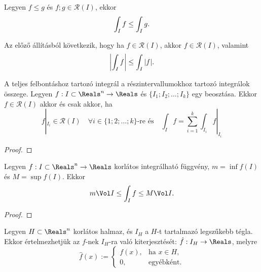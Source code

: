 \begin{statement}
  Legyen $f \leq g$ és $f; g \in \mathcal R(I)$, ekkor
  $$
    \int_I f \leq \int_I g
    \text.
  $$
\end{statement}

\begin{note}
  Az előző állításból következik, hogy ha $f \in \mathcal R(I)$, akkor
  $f \in \mathcal R(I)$, valamint
  $$
    \left| \int_I f \right| \leq \int_I |f|
    \text.
  $$
\end{note}

\begin{statement}
  A teljes felbontáshoz tartozó integrál a részintervallumokhoz tartozó
  integrálok összege. Legyen $f: I \subset \Reals^n \to \Reals$ és
  $\{ I_1; I_2; \ldots; I_k \}$ egy beosztása. Ekkor $f \in \mathcal R(I)$
  akkor és csak akkor, ha
  $$
    f|_{I_i} \in \mathcal R(I)
    \quad
    \forall i \in \{1; 2; \ldots; k\}
    \text{-re és}
    \quad
    \int_I f = \sum_{i = 1}^k \int_{I_i} f|_{I_i}
  $$

  \begin{proof}
    \vspace{6em}
  \end{proof}
\end{statement}

\begin{theorem}[Középértéktétel]
  Legyen $f: I \subset \Reals^n \to \Reals$ korlátos integrálható függvény,
  $m = \inf f(I)$ és $M = \sup f(I)$. Ekkor
  $$
    m \Vol I \leq \int_I f \leq M \Vol I
    \text.
  $$

  \begin{proof}
    \vspace{6em}
  \end{proof}
\end{theorem}

\begin{definition}
  Legyen $H \subset \Reals^n$ korlátos halmaz, és $I_H$ a $H$-t tartalmazó
  legszűkebb tégla. Ekkor értelmezhetjük az $f$-nek $I_H$-ra való
  kiterjesztését: $\hat f: I_H \to \Reals$, melyre
  $$
    \hat f(x) :=
    \begin{cases}
      f(x), & \text{ha } x \in H \text{,} \\
      0,    & \text{egyébként.}
    \end{cases}
  $$
\end{definition}

